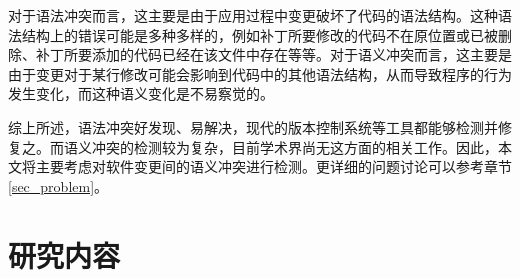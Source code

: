 对于语法冲突而言，这主要是由于应用过程中变更破坏了代码的语法结构。这种语法结构上的错误可能是多种多样的，例如补丁所要修改的代码不在原位置或已被删除、补丁所要添加的代码已经在该文件中存在等等。对于语义冲突而言，这主要是由于变更对于某行修改可能会影响到代码中的其他语法结构，从而导致程序的行为发生变化，而这种语义变化是不易察觉的。


综上所述，语法冲突好发现、易解决，现代的版本控制系统等工具都能够检测并修复之。而语义冲突的检测较为复杂，目前学术界尚无这方面的相关工作。因此，本文将主要考虑对软件变更间的语义冲突进行检测。更详细的问题讨论可以参考章节\ref {sec_problem}。

\section{研究内容}

%
%



%


